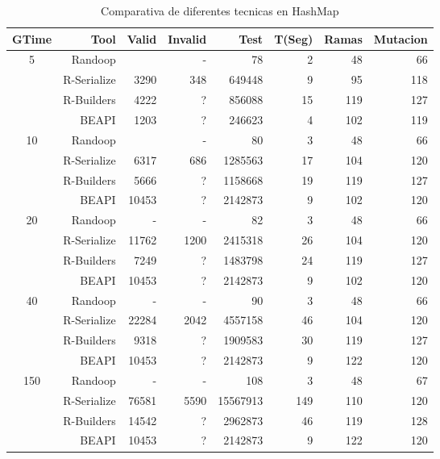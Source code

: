 \begin{table}[H]
\scriptsize
\centering
\begin{tabular}{ c  r  |r | r | r|r|r|r  }
  \toprule
  \textbf{GTime} & \textbf{Tool} & \textbf{Valid}  & \textbf{Invalid} & \textbf{Test}&\textbf{T(Seg)} &\textbf{Ramas}  & \textbf{Mutacion} \\ 
  \midrule
5	&	Randoop	&		&	-	&	78	&	2	&	48	&	66	\\
	&	R-Serialize	&	3290	&	348	&	649448	&	9	&	95	&	118	\\
	&	R-Builders	&	4222	&	?	&	856088	&	15	&	119	&	127	\\
	&	BEAPI	&	1203	&	?	&	246623	&	4	&	102	&	119	 \\
 \cline{2-8}															
10	&	Randoop	&		&	-	&	80	&	3	&	48	&	66	\\
	&	R-Serialize	&	6317	&	686	&	1285563	&	17	&	104	&	120	\\
	&	R-Builders	&	5666	&	?	&	1158668	&	19	&	119	&	127	\\
	&	BEAPI	&	10453	&	?	&	2142873	&	9	&	102	&	120	\\
 \cline{2-8}															
20	&	Randoop	&	-	&	-	&	82	&	3	&	48	&	66	\\
	&	R-Serialize	&	11762	&	1200	&	2415318	&	26	&	104	&	120	\\
	&	R-Builders	&	7249	&	?	&	1483798	&	24	&	119	&	127	\\
	&	BEAPI	&	10453	&	?	&	2142873	&	9	&	102	&	120	 \\
 \cline{2-8}															
40	&	Randoop	&	-	&	-	&	90	&	3	&	48	&	66	\\
	&	R-Serialize	&	22284	&	2042	&	4557158	&	46	&	104	&	120	\\
	&	R-Builders	&	9318	&	?	&	1909583	&	30	&	119	&	127	\\
	&	BEAPI	&	10453	&	?	&	2142873	&	9	&	122	&	120	\\ 
 \cline{2-8}															
150	&	Randoop	&	-	&	-	&	108	&	3	&	48	&	67	\\
	&	R-Serialize	&	76581	&	5590	&	15567913	&	149	&	110	&	120	\\
	&	R-Builders	&	14542	&	?	&	2962873	&	46	&	119	&	128	\\
	&	BEAPI	&	10453	&	?	&	2142873	&	9	&	122	&	120		\\
\midrule
\end{tabular}
\caption{Comparativa de diferentes tecnicas en HashMap}
\label{tab:hashMapTools}
\end{table}
